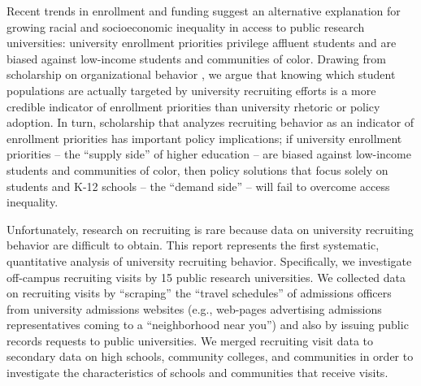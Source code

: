 \documentclass[twoside]{article}
\begin{document}
Recent trends in enrollment and funding suggest an alternative explanation for growing racial and socioeconomic inequality in access to public  research universities: university enrollment priorities privilege affluent students and are biased against low-income students and communities of color. Drawing from scholarship on organizational behavior \citep[e.g., ][]{RN513,RN531,RN1714}, we argue that knowing which student populations are actually targeted by university recruiting efforts is a more credible indicator of enrollment priorities than university rhetoric or policy adoption. In turn, scholarship that analyzes recruiting behavior as an indicator of enrollment priorities has important policy implications; if university enrollment priorities -- the ``supply side'' of higher education -- are biased against low-income students and communities of color, then policy solutions that focus solely on students and K-12 schools -- the ``demand side'' -- will fail to overcome access inequality.

Unfortunately, research on recruiting is rare because data on university recruiting behavior are difficult to obtain.  This report represents the first systematic, quantitative analysis of university recruiting behavior. Specifically, we investigate off-campus recruiting visits by 15 public research universities.  We collected data on recruiting visits by ``scraping'' the ``travel schedules'' of admissions officers from university admissions websites (e.g., web-pages advertising admissions representatives coming to a ``neighborhood near you'') and also by issuing public records requests to public universities.  We merged recruiting visit data to secondary data on high schools, community colleges, and communities in order to investigate the characteristics of schools and communities that receive visits.
\end{document}

